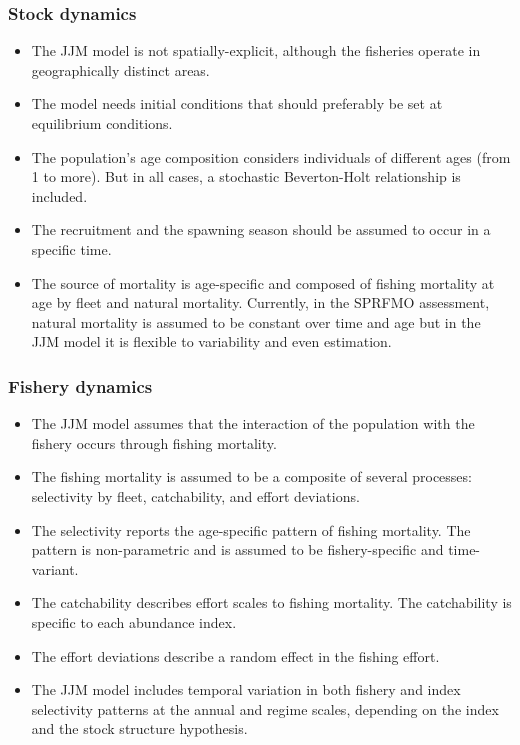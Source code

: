 \documentclass{article}
\begin{document}
\subsubsection{Stock dynamics}

\begin{itemize}

\item The JJM model is not spatially-explicit, although the fisheries operate in geographically distinct areas.

\item The model needs initial conditions that should preferably be set at equilibrium conditions.

\item The population's age composition considers individuals of different ages (from 1 to more). But in all cases, a stochastic Beverton-Holt relationship is included.

\item The recruitment and the spawning season should be assumed to occur in a specific time.

\item The source of mortality is age-specific and composed of fishing mortality at age by fleet and natural mortality. %
Currently, in the SPRFMO assessment, natural mortality is assumed to be constant over time and age but in the JJM model it is flexible to variability and even estimation.

\end{itemize}

\subsubsection{Fishery dynamics}

\begin{itemize}

\item The JJM model assumes that the interaction of the population with the fishery occurs through fishing mortality.
    
\item The fishing mortality is assumed to be a composite of several processes: selectivity by fleet, catchability, and effort deviations.

\item The selectivity reports the age-specific pattern of fishing mortality. The pattern is non-parametric and is assumed to be fishery-specific and time-variant.

\item The catchability describes effort scales to fishing mortality. The catchability is specific to each abundance index.
    
\item The effort deviations describe a random effect in the fishing effort.

\item The JJM model includes temporal variation in both fishery and index selectivity patterns at the annual and regime scales, depending on the index and the stock structure hypothesis.
\end{itemize}
\end{document}
